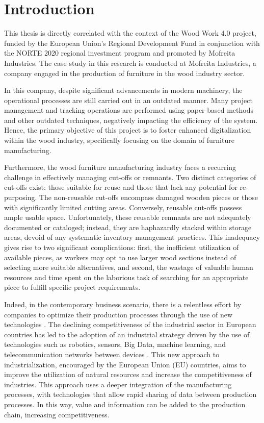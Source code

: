 \chapter{Introduction}\label{cap:intro}

This thesis is directly correlated with the context of the Wood Work 4.0 project, funded by the European Union's Regional Development Fund in conjunction with the NORTE 2020 regional investment program and promoted by Mofreita Industries. The case study in this research is conducted at Mofreita Industries, a company engaged in the production of furniture in the wood industry sector.

In this company, despite significant advancements in modern machinery, the operational processes are still carried out in an outdated manner. Many project management and tracking operations are performed using paper-based methods and other outdated techniques, negatively impacting the efficiency of the system. Hence, the primary objective of this project is to foster enhanced digitalization within the wood industry, specifically focusing on the domain of furniture manufacturing.

Furthermore, the wood furniture manufacturing industry faces a recurring challenge in effectively managing cut-offs or remnants. Two distinct categories of cut-offs exist: those suitable for reuse and those that lack any potential for re-purposing. The non-reusable cut-offs encompass damaged wooden pieces or those with significantly limited cutting areas. Conversely, reusable cut-offs possess ample usable space. Unfortunately, these reusable remnants are not adequately documented or cataloged; instead, they are haphazardly stacked within storage areas, devoid of any systematic inventory management practices. This inadequacy gives rise to two significant complications: first, the inefficient utilization of available pieces, as workers may opt to use larger wood sections instead of selecting more suitable alternatives, and second, the wastage of valuable human resources and time spent on the laborious task of searching for an appropriate piece to fulfill specific project requirements.

Indeed, in the contemporary business scenario, there is a relentless effort by companies to optimize their production processes through the use of new technologies \cite{JewapatarakulDigitalTransformation, DingEffectsofIoT, GUNTHER2017191}. The declining competitiveness of the industrial sector in European countries has led to the adoption of an industrial strategy driven by the use of technologies such as robotics, sensors, Big Data, machine learning, and telecommunication networks between devices \cite{HerreroMeasuringTheEffectivenessOfIndustrialProcesses}. This new approach to industrialization, encouraged by the European Union (EU) countries, aims to improve the utilization of natural resources and increase the competitiveness of industries. This approach uses a deeper integration of the manufacturing processes, with technologies that allow rapid sharing of data between production processes. In this way, value and information can be added to the production chain, increasing competitiveness\cite{Grabowska+2020+90+96}.

